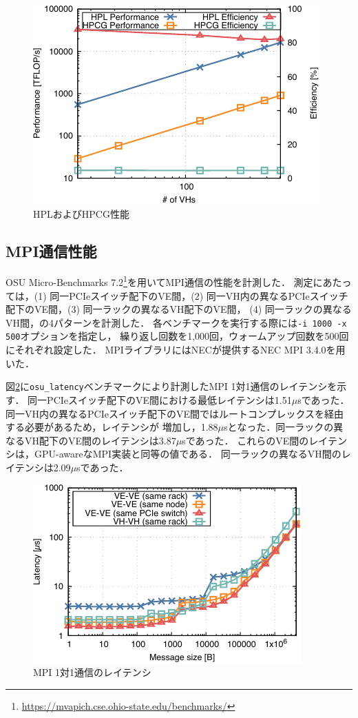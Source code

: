 ﻿\documentclass[submit,techrep,noauthor]{ipsj}
\begin{document}
\begin{figure}[tb]
  \centering
  \includegraphics{figs/hpl_hpcg.pdf}
  \caption{HPLおよびHPCG性能}\label{fig:hpl-hpcg}
\end{figure}

\subsection{MPI通信性能}\label{sec:mpi}

OSU Micro-Benchmarks
7.2\footnote{\url{https://mvapich.cse.ohio-state.edu/benchmarks/}}を用いてMPI通信の性能を計測した．
測定にあたっては，(1) 同一PCIeスイッチ配下のVE間，(2)
同一VH内の異なるPCIeスイッチ配下のVE間，(3) 同一ラックの異なるVH配下のVE間，
(4) 同一ラックの異なるVH間，の4パターンを計測した．
各ベンチマークを実行する際には\verb|-i 1000 -x 500|オプションを指定し，
繰り返し回数を1,000回，ウォームアップ回数を500回にそれぞれ設定した．
MPIライブラリにはNECが提供するNEC MPI 3.4.0を用いた．

図\ref{fig:mpi-lat}に\verb|osu_latency|ベンチマークにより計測したMPI 1対1通信のレイテンシを示す．
同一PCIeスイッチ配下のVE間における最低レイテンシは1.51$\mu$sであった．
同一VH内の異なるPCIeスイッチ配下のVE間ではルートコンプレックスを経由する必要があるため，レイテンシが
増加し，1.88$\mu$sとなった．同一ラックの異なるVH配下のVE間のレイテンシは3.87$\mu$sであった．
これらのVE間のレイテンシは，GPU-awareなMPI実装\cite{Shafie2022}と同等の値である．
同一ラックの異なるVH間のレイテンシは2.09$\mu$sであった．

\begin{figure}[tb]
  \centering
  \includegraphics{figs/mpi_latency.pdf}
  \caption{MPI 1対1通信のレイテンシ}\label{fig:mpi-lat}
\end{figure}
\end{document}

